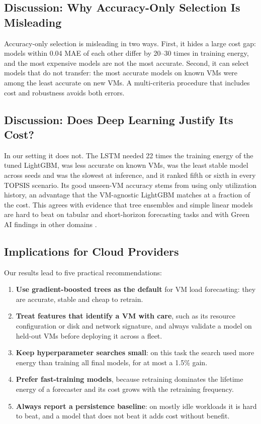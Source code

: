 \documentclass[conference,letterpaper,10pt]{IEEEtran}
\begin{document}
\subsection{Discussion: Why Accuracy-Only Selection Is Misleading}
\label{sec:discussion}
Accuracy-only selection is misleading in two ways. First, it hides a large cost gap: models within 0.04 MAE of each other differ by 20--30 times in training energy, and the most expensive models are not the most accurate. Second, it can select models that do not transfer: the most accurate models on known VMs were among the least accurate on new VMs. A multi-criteria procedure that includes cost and robustness avoids both errors.

\subsection{Discussion: Does Deep Learning Justify Its Cost?}
In our setting it does not. The LSTM needed 22 times the training energy of the tuned LightGBM, was less accurate on known VMs, was the least stable model across seeds and was the slowest at inference, and it ranked fifth or sixth in every TOPSIS scenario. Its good unseen-VM accuracy stems from using only utilization history, an advantage that the VM-agnostic LightGBM matches at a fraction of the cost. This agrees with evidence that tree ensembles and simple linear models are hard to beat on tabular and short-horizon forecasting tasks \cite{grinsztajn2022tree,zeng2023transformers} and with Green AI findings in other domains \cite{vente2024clicks,barros2025small}.

\subsection{Implications for Cloud Providers}
Our results lead to five practical recommendations:
\begin{enumerate}
  \item \textbf{Use gradient-boosted trees as the default} for VM load forecasting: they are accurate, stable and cheap to retrain.
  \item \textbf{Treat features that identify a VM with care}, such as its resource configuration or disk and network signature, and always validate a model on held-out VMs before deploying it across a fleet.
  \item \textbf{Keep hyperparameter searches small}: on this task the search used more energy than training all final models, for at most a 1.5\% gain.
  \item \textbf{Prefer fast-training models}, because retraining dominates the lifetime energy of a forecaster and its cost grows with the retraining frequency.
  \item \textbf{Always report a persistence baseline}: on mostly idle workloads it is hard to beat, and a model that does not beat it adds cost without benefit.
\end{enumerate}
\end{document}
